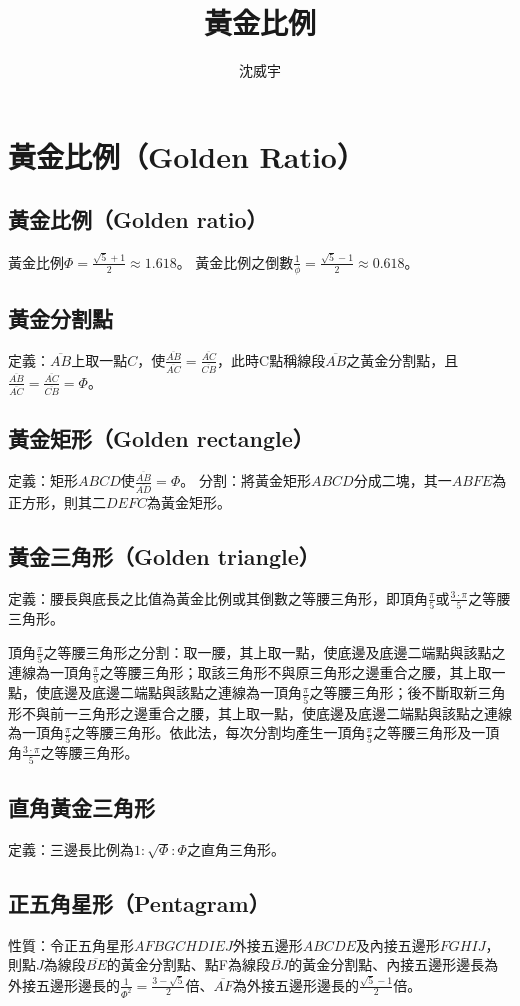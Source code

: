 \documentclass[a4paper,12pt]{article}
\begin{document}
\title{黃金比例}
\author{沈威宇}
\date{\temtoday}
\titletocdoc
\section{黃金比例（Golden Ratio）}
\subsection{黃金比例（Golden ratio）}
黃金比例\(\Phi=\frac{\sqrt{5}+1}{2}\approx1.618\)。\newline
黃金比例之倒數\(\frac{1}{\phi}=\frac{\sqrt{5}-1}{2}\approx0.618\)。
\subsection{黃金分割點}
定義：\(\overline{AB}\)上取一點\(C\)，使\(\frac{\overline{AB}}{\overline{AC}}=\frac{\overline{AC}}{\overline{CB}}\)，此時C點稱線段\(\overline{AB}\)之黃金分割點，且\(\frac{\overline{AB}}{\overline{AC}}=\frac{\overline{AC}}{\overline{CB}}=\Phi\)。
\subsection{黃金矩形（Golden rectangle）}
定義：矩形\(ABCD\)使\(\frac{\overline{AB}}{\overline{AD}}=\Phi\)。\newline
分割：將黃金矩形\(ABCD\)分成二塊，其一\(ABFE\)為正方形，則其二\(DEFC\)為黃金矩形。
\subsection{黃金三角形（Golden triangle）}
定義：腰長與底長之比值為黃金比例或其倒數之等腰三角形，即頂角\(\frac{\pi}{5}\)或\(\frac{3\cdot\pi}{5}\)之等腰三角形。

頂角\(\frac{\pi}{5}\)之等腰三角形之分割：取一腰，其上取一點，使底邊及底邊二端點與該點之連線為一頂角\(\frac{\pi}{5}\)之等腰三角形；取該三角形不與原三角形之邊重合之腰，其上取一點，使底邊及底邊二端點與該點之連線為一頂角\(\frac{\pi}{5}\)之等腰三角形；後不斷取新三角形不與前一三角形之邊重合之腰，其上取一點，使底邊及底邊二端點與該點之連線為一頂角\(\frac{\pi}{5}\)之等腰三角形。依此法，每次分割均產生一頂角\(\frac{\pi}{5}\)之等腰三角形及一頂角\(\frac{3\cdot\pi}{5}\)之等腰三角形。
\subsection{直角黃金三角形}
定義：三邊長比例為\(1:\sqrt{\Phi}:\Phi\)之直角三角形。
\subsection{正五角星形（Pentagram）}
性質：令正五角星形\(AFBGCHDIEJ\)外接五邊形\(ABCDE\)及內接五邊形\(FGHIJ\)，則點\(J\)為線段\(\overline{BE}\)的黃金分割點、點F為線段\(\overline{BJ}\)的黃金分割點、內接五邊形邊長為外接五邊形邊長的\(\frac{1}{\Phi^2}=\frac{3-\sqrt{5}}{2}\)倍、\(\overline{AF}\)為外接五邊形邊長的\(\frac{\sqrt{5}-1}{2}\)倍。
\end{document}
